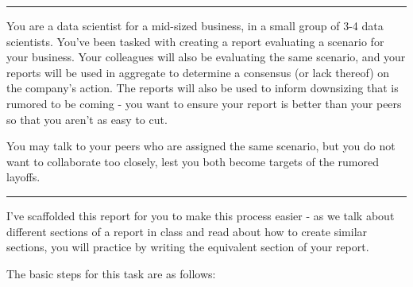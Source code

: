 \documentclass[
  letterpaper,
  DIV=11,
  numbers=noendperiod]{scrreprt}
\begin{document}
\begin{center}\rule{0.5\linewidth}{0.5pt}\end{center}

You are a data scientist for a mid-sized business, in a small group of
3-4 data scientists. You've been tasked with creating a report
evaluating a scenario for your business. Your colleagues will also be
evaluating the same scenario, and your reports will be used in aggregate
to determine a consensus (or lack thereof) on the company's action. The
reports will also be used to inform downsizing that is rumored to be
coming - you want to ensure your report is better than your peers so
that you aren't as easy to cut.

You may talk to your peers who are assigned the same scenario, but you
do not want to collaborate too closely, lest you both become targets of
the rumored layoffs.

\begin{center}\rule{0.5\linewidth}{0.5pt}\end{center}

I've scaffolded this report for you to make this process easier - as we
talk about different sections of a report in class and read about how to
create similar sections, you will practice by writing the equivalent
section of your report.

The basic steps for this task are as follows:
\end{document}
